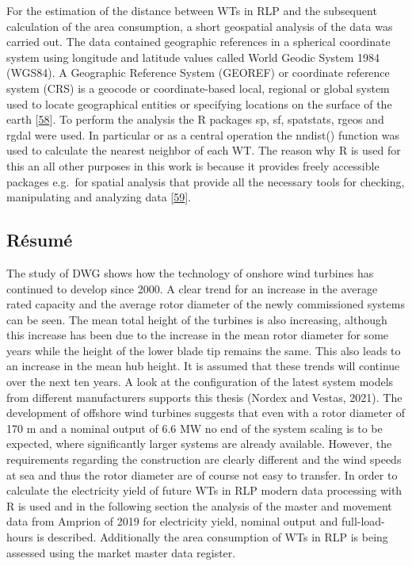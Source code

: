 \documentclass[a4paper,11pt]{article}
\begin{document}
For the estimation of the distance between WTs in RLP and the subsequent calculation of the area consumption, a short geospatial analysis of the data was carried out. The data contained geographic references in a spherical coordinate system using longitude and latitude values called World Geodic System 1984 (WGS84). A Geographic Reference System (GEOREF) or coordinate reference system (CRS) is a geocode or coordinate-based local, regional or global system used to locate geographical entities or specifying locations on the surface of the earth {[}\protect\hyperlink{ref-ISO.2007}{58}{]}. To perform the analysis the R packages sp, sf, spatstats, rgeos and rgdal were used. In particular or as a central operation the nndist() function was used to calculate the nearest neighbor of each WT. The reason why R is used for this an all other purposes in this work is because it provides freely accessible packages e.g.~for spatial analysis that provide all the necessary tools for checking, manipulating and analyzing data {[}\protect\hyperlink{ref-RogerS.Bivan.2008}{59}{]}.

\hypertarget{ruxe9sumuxe9}{%
\subsection{Résumé}\label{ruxe9sumuxe9}}

The study of DWG shows how the technology of onshore wind turbines has continued to develop since 2000. A clear trend for an increase in the average rated capacity and the average rotor diameter of the newly commissioned systems can be seen. The mean total height of the turbines is also increasing, although this increase has been due to the increase in the mean rotor diameter for some years while the height of the lower blade tip remains the same. This also leads to an increase in the mean hub height. It is assumed that these trends will continue over the next ten years. A look at the configuration of the latest system models from different manufacturers supports this thesis (Nordex and Vestas, 2021). The development of offshore wind turbines suggests that even with a rotor diameter of 170 m and a nominal output of 6.6 MW no end of the system scaling is to be expected, where significantly larger systems are already available. However, the requirements regarding the construction are clearly different and the wind speeds at sea and thus the rotor diameter are of course not easy to transfer. In order to calculate the electricity yield of future WTs in RLP modern data processing with R is used and in the following section the analysis of the master and movement data from Amprion of 2019 for electricity yield, nominal output and full-load-hours is described. Additionally the area consumption of WTs in RLP is being assessed using the market master data register.
\end{document}
